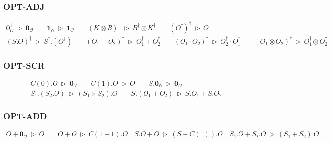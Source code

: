 \documentclass[manuscript, review, timestamp]{acmart}
\newcommand*{\reduce}{\ \triangleright\ }
\begin{document}
\subsubsection*{\textsf{OPT-ADJ}}
\begin{gather*}
  \textbf{0}_\mathcal{O}^\dagger \reduce \textbf{0}_\mathcal{O}
  \qquad
  \textbf{1}_\mathcal{O}^\dagger \reduce \textbf{1}_\mathcal{O}
  \qquad
  (K \otimes B)^\dagger \reduce B^\dagger \otimes K^\dagger
  \qquad
  (O^\dagger)^\dagger \reduce O \\
  (S.O)^\dagger \reduce S^*.(O^\dagger)
  \qquad
  (O_1 + O_2)^\dagger \reduce O_1^\dagger + O_2^\dagger
  \qquad
  (O_1 \cdot O_2)^\dagger \reduce O_2^\dagger \cdot O_1^\dagger
  \qquad
  (O_1 \otimes O_2)^\dagger \reduce O_1^\dagger \otimes O_2^\dagger
\end{gather*}

\subsubsection*{\textsf{OPT-SCR}}
\begin{gather*}
  C(0).O \reduce \mathbf{0}_\mathcal{O}
  \qquad
  C(1).O \reduce O
  \qquad
  S.\textbf{0}_\mathcal{O} \reduce \textbf{0}_\mathcal{O} \\
  S_1.(S_2.O) \reduce (S_1 \times S_2).O
  \qquad
  S.(O_1 + O_2) \reduce S.O_1 + S.O_2
\end{gather*}

\subsubsection*{\textsf{OPT-ADD}}
\begin{gather*}
  O + \mathbf{0}_\mathcal{O} \reduce O
  \qquad
  O + O \reduce C(1 + 1).O
  \quad
  S.O + O \reduce (S + C(1)).O
  \quad
  S_1.O + S_2.O \reduce (S_1 + S_2).O
\end{gather*}
\end{document}

